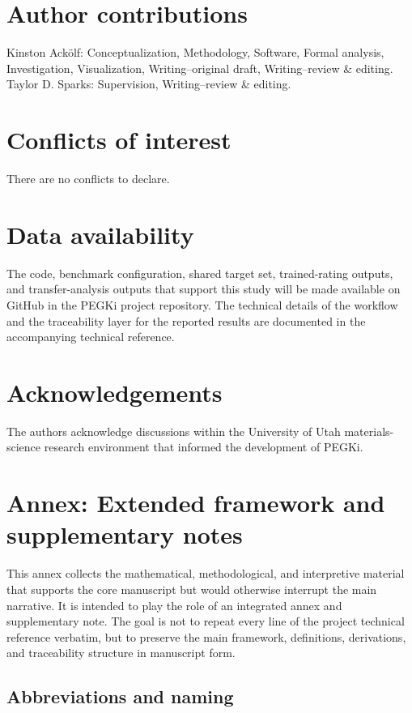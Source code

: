 \documentclass[twoside,twocolumn,9pt]{article}
\begin{document}
\section*{Author contributions}
Kinston Ack{\"o}lf: Conceptualization, Methodology, Software, Formal analysis, Investigation, Visualization, Writing--original draft, Writing--review \& editing. Taylor D. Sparks: Supervision, Writing--review \& editing.

\section*{Conflicts of interest}
There are no conflicts to declare.

\section*{Data availability}
The code, benchmark configuration, shared target set, trained-rating outputs, and transfer-analysis outputs that support this study will be made available on GitHub in the PEGKi project repository. The technical details of the workflow and the traceability layer for the reported results are documented in the accompanying technical reference.

\section*{Acknowledgements}
The authors acknowledge discussions within the University of Utah materials-science research environment that informed the development of PEGKi.




\clearpage
\appendix
\section{Annex: Extended framework and supplementary notes}

This annex collects the mathematical, methodological, and interpretive material that supports the core manuscript but would otherwise interrupt the main narrative. It is intended to play the role of an integrated annex and supplementary note. The goal is not to repeat every line of the project technical reference verbatim, but to preserve the main framework, definitions, derivations, and traceability structure in manuscript form.

\subsection{Abbreviations and naming}
\end{document}

